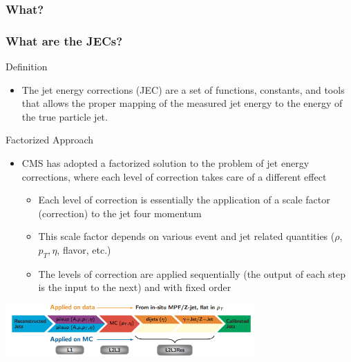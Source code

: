 \begin{frame}
\begin{columns}
\begin{column}{0.49\textwidth}
		\end{column}
	\end{columns}
\end{frame}

\subsubsection{What?}
\begin{frame}
	\frametitle{What are the JECs?}
	\vspace*{-0.24cm}
	\begin{block}{Definition}
		\begin{itemize}
			\item The jet energy corrections (JEC) are a set of functions, constants, and tools that allows the proper mapping of the measured jet energy to the energy of the true particle jet. 
		\end{itemize}
	\end{block}
	\vspace*{-0.15cm}
	\begin{block}{Factorized Approach}
		\begin{itemize}
			\item CMS has adopted a factorized solution to the problem of jet energy corrections, where each level of correction takes care of a different effect
			\begin{itemize}
				\footnotesize
				\item Each level of correction is essentially the application of a scale factor (correction) to the jet four momentum
				\item This scale factor depends on various event and jet related quantities ($\rho$, $p_{T}, \eta$, flavor, etc.)
				\item The levels of correction are applied sequentially (the output of each step is the input to the next) and with fixed order
			\end{itemize}
		\end{itemize}
	\end{block}
	\vspace*{-0.15cm}
	\begin{center}
		\includegraphics[width=9.5cm]{images/jecs.png}
	\end{center}
\end{frame}
